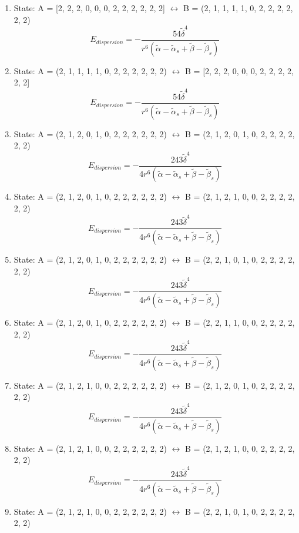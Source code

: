 \documentclass[12pt,a4paper]{article}
\begin{document}
\begin{enumerate}
 \item State: A = [2, 2, 2, 0, 0, 0, 2, 2, 2, 2, 2, 2] $\leftrightarrow$ B = (2, 1, 1, 1, 1, 0, 2, 2, 2, 2, 2, 2) 
$$E_{dispersion} =- \frac{54 \tilde{\delta}^{4}}{r^{6} \left(\tilde{\alpha} - \tilde{\alpha}_{s} + \tilde{\beta} - \tilde{\beta}_{s}\right)}$$
 \item State: A = (2, 1, 1, 1, 1, 0, 2, 2, 2, 2, 2, 2) $\leftrightarrow$ B = [2, 2, 2, 0, 0, 0, 2, 2, 2, 2, 2, 2] 
$$E_{dispersion} =- \frac{54 \tilde{\delta}^{4}}{r^{6} \left(\tilde{\alpha} - \tilde{\alpha}_{s} + \tilde{\beta} - \tilde{\beta}_{s}\right)}$$
 \item State: A = (2, 1, 2, 0, 1, 0, 2, 2, 2, 2, 2, 2) $\leftrightarrow$ B = (2, 1, 2, 0, 1, 0, 2, 2, 2, 2, 2, 2) 
$$E_{dispersion} =- \frac{243 \tilde{\delta}^{4}}{4 r^{6} \left(\tilde{\alpha} - \tilde{\alpha}_{s} + \tilde{\beta} - \tilde{\beta}_{s}\right)}$$
 \item State: A = (2, 1, 2, 0, 1, 0, 2, 2, 2, 2, 2, 2) $\leftrightarrow$ B = (2, 1, 2, 1, 0, 0, 2, 2, 2, 2, 2, 2) 
$$E_{dispersion} =- \frac{243 \tilde{\delta}^{4}}{4 r^{6} \left(\tilde{\alpha} - \tilde{\alpha}_{s} + \tilde{\beta} - \tilde{\beta}_{s}\right)}$$
 \item State: A = (2, 1, 2, 0, 1, 0, 2, 2, 2, 2, 2, 2) $\leftrightarrow$ B = (2, 2, 1, 0, 1, 0, 2, 2, 2, 2, 2, 2) 
$$E_{dispersion} =- \frac{243 \tilde{\delta}^{4}}{4 r^{6} \left(\tilde{\alpha} - \tilde{\alpha}_{s} + \tilde{\beta} - \tilde{\beta}_{s}\right)}$$
 \item State: A = (2, 1, 2, 0, 1, 0, 2, 2, 2, 2, 2, 2) $\leftrightarrow$ B = (2, 2, 1, 1, 0, 0, 2, 2, 2, 2, 2, 2) 
$$E_{dispersion} =- \frac{243 \tilde{\delta}^{4}}{4 r^{6} \left(\tilde{\alpha} - \tilde{\alpha}_{s} + \tilde{\beta} - \tilde{\beta}_{s}\right)}$$
 \item State: A = (2, 1, 2, 1, 0, 0, 2, 2, 2, 2, 2, 2) $\leftrightarrow$ B = (2, 1, 2, 0, 1, 0, 2, 2, 2, 2, 2, 2) 
$$E_{dispersion} =- \frac{243 \tilde{\delta}^{4}}{4 r^{6} \left(\tilde{\alpha} - \tilde{\alpha}_{s} + \tilde{\beta} - \tilde{\beta}_{s}\right)}$$
 \item State: A = (2, 1, 2, 1, 0, 0, 2, 2, 2, 2, 2, 2) $\leftrightarrow$ B = (2, 1, 2, 1, 0, 0, 2, 2, 2, 2, 2, 2) 
$$E_{dispersion} =- \frac{243 \tilde{\delta}^{4}}{4 r^{6} \left(\tilde{\alpha} - \tilde{\alpha}_{s} + \tilde{\beta} - \tilde{\beta}_{s}\right)}$$
 \item State: A = (2, 1, 2, 1, 0, 0, 2, 2, 2, 2, 2, 2) $\leftrightarrow$ B = (2, 2, 1, 0, 1, 0, 2, 2, 2, 2, 2, 2) 

\end{enumerate}
\end{document}
